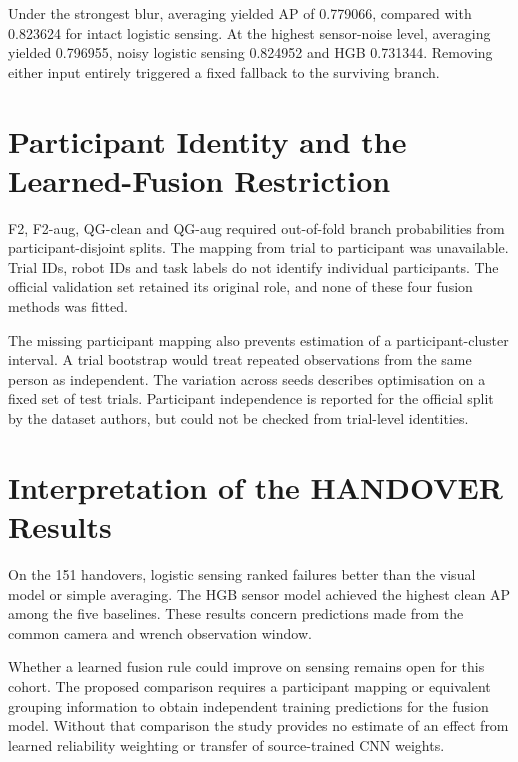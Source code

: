 Under the strongest blur, averaging yielded AP of 0.779066, compared with 0.823624 for
intact logistic sensing. At the highest sensor-noise level, averaging yielded 0.796955,
noisy logistic sensing 0.824952 and HGB 0.731344. Removing either input entirely
triggered a fixed fallback to the surviving branch.

\section{Participant Identity and the Learned-Fusion Restriction}
F2, F2-aug, QG-clean and QG-aug required out-of-fold branch probabilities from
participant-disjoint splits. The mapping from trial to participant was unavailable.
Trial IDs, robot IDs and task labels do not identify individual participants. The
official validation set retained its original role, and none of these four fusion
methods was fitted.

The missing participant mapping also prevents estimation of a participant-cluster
interval. A trial bootstrap would treat repeated observations from the same person as
independent. The variation across seeds describes optimisation on a fixed set of test
trials. Participant independence is reported for the official split by the dataset
authors, but could not be checked from trial-level identities.

\section{Interpretation of the HANDOVER Results}
On the 151 handovers, logistic sensing ranked failures better than the visual model or
simple averaging. The HGB sensor model achieved the highest clean AP among the five
baselines. These results concern predictions made from the common camera and wrench
observation window.

Whether a learned fusion rule could improve on sensing remains open for this cohort. The
proposed comparison requires a participant mapping or equivalent grouping information to
obtain independent training predictions for the fusion model. Without that comparison
the study provides no estimate of an effect from learned reliability weighting or
transfer of source-trained CNN weights.
